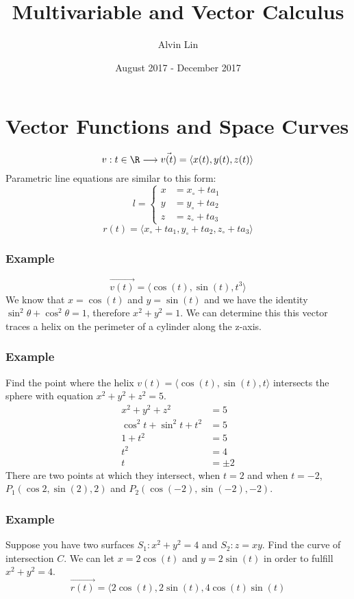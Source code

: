 \documentclass{math}
\title{Multivariable and Vector Calculus}
\author{Alvin Lin}
\date{August 2017 - December 2017}
\begin{document}
\maketitle

\section*{Vector Functions and Space Curves}
\[ v:t\in\R \longrightarrow \vec{v(t)} = \langle x(t),y(t),z(t)\rangle \]
Parametric line equations are similar to this form:
\[ l = \begin{cases}
  x &= x_{\circ}+ta_1 \\
  y &= y_{\circ}+ta_2 \\
  z &= z_{\circ}+ta_3
\end{cases} \]
\[ r(t) = \langle x_{\circ}+ta_1,y_{\circ}+ta_2,z_{\circ}+ta_3\rangle \]

\subsubsection*{Example}
\[ \vec{v(t)} = \langle\cos(t),\sin(t),t^3\rangle \]
We know that \( x = \cos(t) \) and \( y = \sin(t) \) and we have the identity
\( \sin^2\theta+\cos^2\theta = 1 \), therefore \( x^2+y^2 = 1 \). We can
determine this this vector traces a helix on the perimeter of a cylinder along
the z-axis.

\subsubsection*{Example}
Find the point where the helix \( v(t) = \langle\cos(t),\sin(t),t\rangle \)
intersects the sphere with equation \( x^2+y^2+z^2 = 5 \).
\begin{align*}
  x^2+y^2+z^2 &= 5 \\
  \cos^2t+\sin^2t+t^2 &= 5 \\
  1+t^2 &= 5 \\
  t^2 &= 4 \\
  t &= \pm2
\end{align*}
There are two points at which they intersect, when \( t = 2 \) and when
\( t = -2 \), \( P_1(\cos2,\sin(2),2) \) and \( P_2(\cos(-2),\sin(-2),-2) \).

\subsubsection*{Example}
Suppose you have two surfaces \( S_1:x^2+y^2 = 4 \) and \( S_2:z=xy \). Find
the curve of intersection \( C \). We can let \( x = 2\cos(t) \) and
\( y = 2\sin(t) \) in order to fulfill \( x^2+y^2 = 4 \).
\[ \vec{r(t)} = \langle2\cos(t),2\sin(t),4\cos(t)\sin(t) \]
\end{document}
